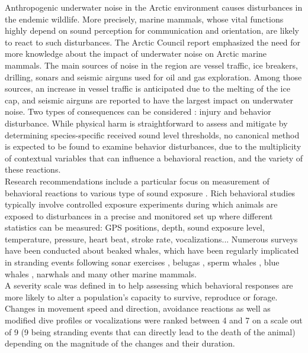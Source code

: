 \documentclass[11pt]{article}
\newcommand {\1}{\mathbb{1}}
\begin{document}
Anthropogenic underwater noise in the Arctic environment causes disturbances in the endemic wildlife. More precisely, marine mammals, whose vital functions highly depend on sound perception for communication and orientation, are likely to react to such disturbances. The Arctic Council report \cite{halliday_underwater_2020} emphasized the need for more knowledge about the impact of underwater noise on Arctic marine mammals. The main sources of noise in the region are vessel traffic, ice breakers, drilling, sonars and seismic airguns used for oil and gas exploration. Among those sources, an increase in vessel traffic is anticipated due to the melting of the ice cap, and seismic airguns are reported to have the largest impact on underwater noise. Two types of consequences can be considered : injury and behavior disturbance. While physical harm is straightforward to assess and mitigate by determining species-specific received sound level thresholds, no canonical method is expected to be found to examine behavior disturbances, due to the multiplicity of contextual variables that can influence a behavioral reaction, and the variety of these reactions.\\
Research recommendations include a particular focus on measurement of behavioral reactions to various type of sound exposure \cite{southall_marine_2008,southall_marine_2019}. Rich behavioral studies typically involve controlled exposure experiments during which animals are exposed to disturbances in a precise and monitored set up where different  statistics can be measured: GPS positions, depth, sound exposure level, temperature, pressure, heart beat, stroke rate, vocalizations... Numerous surveys have been conducted about beaked whales, which have been regularly implicated in stranding events following sonar exercises \cite{tyack_beaked_2011,cioffi_trade-offs_2022}, belugas \cite{martin_exposure_2023}, sperm whales \cite{madsen_quantitative_2006}, blue whales \cite{friedlaender_preymediated_2016}, narwhals \cite{heide-jorgensen_behavioral_2021,tervo_narwhals_2021} and many other marine mammals. \\
A severity scale was defined in \cite{southall_marine_2008} to help assessing which behavioral responses are more likely to alter a population's capacity to survive, reproduce or forage. Changes in movement speed and direction, avoidance reactions as well as modified dive profiles or vocalizations  were ranked between 4 and 7 on a scale out of 9 (9 being stranding events that can directly lead to the death of the animal) depending on the magnitude of the changes and their duration.\\
\end{document}
